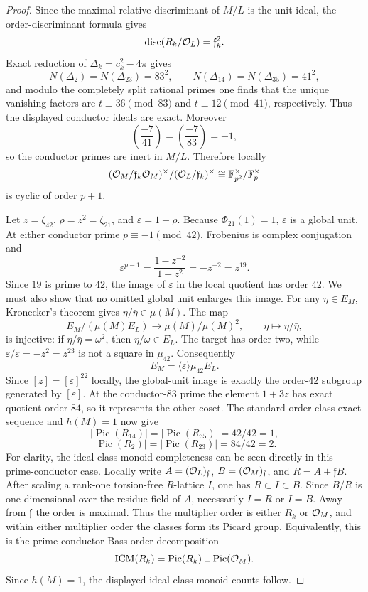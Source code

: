 \begin{proof}
Since the maximal relative discriminant of $M/L$ is the unit ideal, the order-discriminant formula gives
\[
 \operatorname{disc}(R_k/\mathcal O_L)=\mathfrak f_k^2.
\]
Exact reduction of $\Delta_k=c_k^2-4\pi$ gives
\[
 N(\Delta_2)=N(\Delta_{23})=83^2,
 \qquad
 N(\Delta_{14})=N(\Delta_{35})=41^2,
\]
and modulo the completely split rational primes one finds that the unique vanishing factors are $t\equiv36\pmod{83}$ and $t\equiv12\pmod{41}$, respectively.  Thus the displayed conductor ideals are exact.  Moreover
\[
 \left(\frac{-7}{41}\right)=\left(\frac{-7}{83}\right)=-1,
\]
so the conductor primes are inert in $M/L$.  Therefore locally
\[
 (\mathcal O_M/\mathfrak f_k\mathcal O_M)^\times/(\mathcal O_L/\mathfrak f_k)^\times
 \cong \mathbb F_{p^2}^\times/\mathbb F_p^\times
\]
is cyclic of order $p+1$.

Let $z=\zeta_{42}$, $\rho=z^2=\zeta_{21}$, and $\varepsilon=1-\rho$.  Because $\Phi_{21}(1)=1$, $\varepsilon$ is a global unit.  At either conductor prime $p\equiv-1\pmod{42}$, Frobenius is complex conjugation and
\[
 \varepsilon^{p-1}
 =\frac{1-z^{-2}}{1-z^2}
 =-z^{-2}=z^{19}.
\]
Since $19$ is prime to $42$, the image of $\varepsilon$ in the local quotient has order $42$.
We must also show that no omitted global unit enlarges this image.  For any
$\eta\in E_M$, Kronecker's theorem gives
$\eta/\bar\eta\in\mu(M)$.  The map
\[
 E_M/(\mu(M)E_L)\longrightarrow \mu(M)/\mu(M)^2,
 \qquad \eta\longmapsto\eta/\bar\eta,
\]
is injective: if $\eta/\bar\eta=\omega^2$, then $\eta/\omega\in E_L$.
The target has order two, while
$\varepsilon/\bar\varepsilon=-z^2=z^{23}$ is not a square in $\mu_{42}$.
Consequently
\[
 E_M=\langle\varepsilon\rangle\mu_{42}E_L.
\]
Since $[z]=[\varepsilon]^{22}$ locally, the global-unit image is exactly the
order-$42$ subgroup generated by $[\varepsilon]$.  At the conductor-$83$
prime the element $1+3z$ has exact quotient order $84$, so it represents the
other coset.  The standard order class exact sequence and $h(M)=1$ now give
\[
 |\operatorname{Pic}(R_{14})|=|\operatorname{Pic}(R_{35})|=42/42=1,
\]
\[
 |\operatorname{Pic}(R_2)|=|\operatorname{Pic}(R_{23})|=84/42=2.
\]
For clarity, the ideal-class-monoid completeness can be seen directly in this
prime-conductor case.  Locally write $A=(\mathcal O_L)_{\mathfrak f}$,
$B=(\mathcal O_M)_{\mathfrak f}$, and $R=A+\mathfrak fB$.  After scaling a rank-one
torsion-free $R$-lattice $I$, one has $R\subset I\subset B$.  Since $B/R$ is
one-dimensional over the residue field of $A$, necessarily $I=R$ or $I=B$.
Away from $\mathfrak f$ the order is maximal.  Thus the multiplier order is
either $R_k$ or $\mathcal O_M$, and within either multiplier order the classes form its
Picard group.  Equivalently, this is the prime-conductor Bass-order
decomposition
\[
 \operatorname{ICM}(R_k)
 =\operatorname{Pic}(R_k)\sqcup\operatorname{Pic}(\mathcal O_M).
\]
Since $h(M)=1$, the displayed ideal-class-monoid counts follow.


\end{proof}
